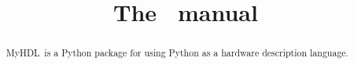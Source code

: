 \documentclass{manual}
\title{The \myhdl\ manual}
\newcommand{\myhdl}{{MyHDL}}
\begin{document}
\maketitle



\begin{abstract}

\noindent
\myhdl\ is a Python package for using Python as a hardware description
language. 

\end{abstract}

\tableofcontents






\end{document}
